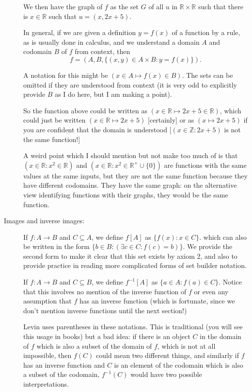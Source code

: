 \documentclass[12pt]{article}
\begin{document}
\begin{description}
We then have the graph of $f$ as the set $G$ of all $u$ in $\mathbb R \times \mathbb R$ such that there is $x \in \mathbb R$ such that $u = (x,2x+5)$.

In general, if we are given a definition $y = f(x)$ of a function by a rule, as is usually done in calculus, and we understand a domain $A$ and codomain $B$ of $f$ from context,
then $$f=(A,B,\{(x,y) \in A \times B:y=f(x)\}).$$

A notation for this might be $(x\in A \mapsto f(x)\in B)$.  The sets can be omitted if they are understood from context (it is very odd to explicitly provide $B$ as I do here, but I am making a point).

So the function above could be written as $(x \in \mathbb R \mapsto 2x+5 \in \mathbb R)$, which could just be written $(x \in \mathbb R \mapsto 2x+5)$ [certainly] or as
$(x \mapsto 2x+5)$ if you are confident that the domain is understood [$(x \in \mathbb Z:2x+5)$ is not the same function!]

A weird point which I should mention but not make too much of is that $(x \in {\mathbb R}:x^2 \in \mathbb R)$ and $(x \in {\mathbb R}:x^2 \in \mathbb R^+ \cup \{0\})$ are functions with the same values at the same inputs, but they are not the same function because they have different codomains.  They have the same graph:  on the alternative view identifying functions with their graphs, they would be the same function.


\item[Images and inverse images:]

If $f:A \rightarrow B$ and $C \subseteq A$, we define $f[A]$ as $\{f(x):x \in C\}$. which can also be written in the form $\{b \in B:(\exists c \in C:f(c)=b)\}$.  We provide the second form to make it clear
that this set exists by axiom 2, and also to provide practice in reading more complicated forms of set builder notation.

If $f:A \rightarrow B$ and $C \subseteq B$, we define $f^{-1}[A]$ as $\{a \in A:f(a) \in C\}$.  Notice that this involves no mention of the inverse function of $f$ or even any assumption that $f$ has an inverse function (which is fortunate, since we don't mention inverse functions until the next section!)

Levin uses parentheses in these notations.  This is traditional (you will see this usage in books) but a bad idea:  if there is an object $C$ in the domain of $f$ which is also a subset of the domain of $f$, which is not at all impossible,
then $f(C)$ could mean two different things, and similarly if $f$ has an inverse function and $C$ is an element of the codomain which is also a subset of the codomain, $f^{-1}(C)$ would have two possible interpretations.


\end{description}
\end{document}

